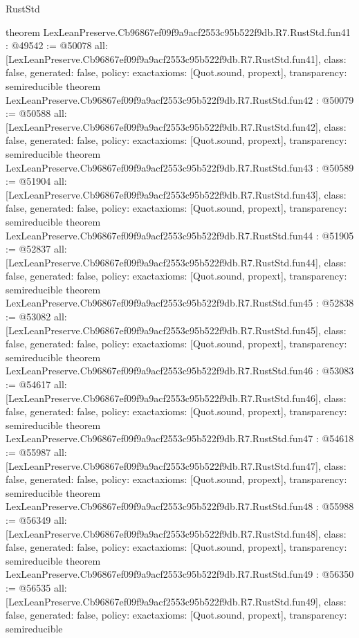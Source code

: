\begin{lexlean}{RustStd}
\begin{coremodule}
{}
theorem LexLeanPreserve.Cb96867ef09f9a9acf2553c95b522f9db.R7.RustStd.fun41 : @49542 := @50078 {
  all: [LexLeanPreserve.Cb96867ef09f9a9acf2553c95b522f9db.R7.RustStd.fun41],
  class: false,
  generated: false,
  policy: exact{axioms: [Quot.sound, propext]},
  transparency: semireducible
}
theorem LexLeanPreserve.Cb96867ef09f9a9acf2553c95b522f9db.R7.RustStd.fun42 : @50079 := @50588 {
  all: [LexLeanPreserve.Cb96867ef09f9a9acf2553c95b522f9db.R7.RustStd.fun42],
  class: false,
  generated: false,
  policy: exact{axioms: [Quot.sound, propext]},
  transparency: semireducible
}
theorem LexLeanPreserve.Cb96867ef09f9a9acf2553c95b522f9db.R7.RustStd.fun43 : @50589 := @51904 {
  all: [LexLeanPreserve.Cb96867ef09f9a9acf2553c95b522f9db.R7.RustStd.fun43],
  class: false,
  generated: false,
  policy: exact{axioms: [Quot.sound, propext]},
  transparency: semireducible
}
theorem LexLeanPreserve.Cb96867ef09f9a9acf2553c95b522f9db.R7.RustStd.fun44 : @51905 := @52837 {
  all: [LexLeanPreserve.Cb96867ef09f9a9acf2553c95b522f9db.R7.RustStd.fun44],
  class: false,
  generated: false,
  policy: exact{axioms: [Quot.sound, propext]},
  transparency: semireducible
}
theorem LexLeanPreserve.Cb96867ef09f9a9acf2553c95b522f9db.R7.RustStd.fun45 : @52838 := @53082 {
  all: [LexLeanPreserve.Cb96867ef09f9a9acf2553c95b522f9db.R7.RustStd.fun45],
  class: false,
  generated: false,
  policy: exact{axioms: [Quot.sound, propext]},
  transparency: semireducible
}
theorem LexLeanPreserve.Cb96867ef09f9a9acf2553c95b522f9db.R7.RustStd.fun46 : @53083 := @54617 {
  all: [LexLeanPreserve.Cb96867ef09f9a9acf2553c95b522f9db.R7.RustStd.fun46],
  class: false,
  generated: false,
  policy: exact{axioms: [Quot.sound, propext]},
  transparency: semireducible
}
theorem LexLeanPreserve.Cb96867ef09f9a9acf2553c95b522f9db.R7.RustStd.fun47 : @54618 := @55987 {
  all: [LexLeanPreserve.Cb96867ef09f9a9acf2553c95b522f9db.R7.RustStd.fun47],
  class: false,
  generated: false,
  policy: exact{axioms: [Quot.sound, propext]},
  transparency: semireducible
}
theorem LexLeanPreserve.Cb96867ef09f9a9acf2553c95b522f9db.R7.RustStd.fun48 : @55988 := @56349 {
  all: [LexLeanPreserve.Cb96867ef09f9a9acf2553c95b522f9db.R7.RustStd.fun48],
  class: false,
  generated: false,
  policy: exact{axioms: [Quot.sound, propext]},
  transparency: semireducible
}
theorem LexLeanPreserve.Cb96867ef09f9a9acf2553c95b522f9db.R7.RustStd.fun49 : @56350 := @56535 {
  all: [LexLeanPreserve.Cb96867ef09f9a9acf2553c95b522f9db.R7.RustStd.fun49],
  class: false,
  generated: false,
  policy: exact{axioms: [Quot.sound, propext]},
  transparency: semireducible
}
\end{coremodule}
\end{lexlean}
